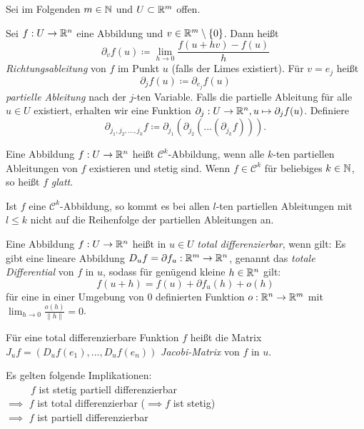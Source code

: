 \documentclass{cheat-sheet}
\begin{document}
\begin{nota}
  Sei im Folgenden $m \in \mathbb{N}$ und $U \subset \mathbb{R}^m$ offen.
\end{nota}

\begin{definition}
  Sei $f : U \to \mathbb{R}^n$ eine Abbildung und $v \in \mathbb{R}^m \setminus \{ 0 \}$. Dann heißt
  \[ \partial_v f(u) \coloneqq \lim_{h \to 0} \frac{f(u + hv) - f(u)}{ h } \]
  \emph{Richtungsableitung} von $f$ im Punkt $u$ (falls der Limes existiert). Für $v = e_j$ heißt
  \[ \partial_j f(u) \coloneqq \partial_{e_j} f(u) \]
  \emph{partielle Ableitung} nach der $j$-ten Variable. Falls die partielle Ableitung für alle $u \in U$ existiert, erhalten wir eine Funktion $\partial_j : U \to \mathbb{R}^n, u \mapsto \partial_j f(u)$. Definiere
  \[ \partial_{j_1, j_2, ..., j_k} f \coloneqq \partial_{j_1} ( \partial_{j_2} ( ... ( \partial_{j_k} f) ) ). \]
\end{definition}

\begin{definition}
  Eine Abbildung $f : U \to \mathbb{R}^n$ heißt $\mathcal{C}^k$-Abbildung, wenn alle $k$-ten partiellen Ableitungen von $f$ existieren und stetig sind. Wenn $f \in \mathcal{C}^k$ für beliebiges $k \in \mathbb{N}$, so heißt $f$ \emph{glatt}.
\end{definition}

\begin{satz}[Schwarz]
  Ist $f$ eine $\mathcal{C}^k$-Abbildung, so kommt es bei allen $l$-ten partiellen Ableitungen mit $l \leq k$ nicht auf die Reihenfolge der partiellen Ableitungen an.
\end{satz}

\begin{definition}
  Eine Abbildung $f : U \to \mathbb{R}^n$ heißt in $u \in U$ \emph{total differenzierbar}, wenn gilt: Es gibt eine lineare Abbildung $D_u f = \partial f_u : \mathbb{R}^m \to \mathbb{R}^n$, genannt das \emph{totale Differential} von $f$ in $u$, sodass für genügend kleine $h \in \mathbb{R}^n$ gilt:
  \[ f(u + h) = f(u) + \partial f_u(h) + o(h) \]
  für eine in einer Umgebung von $0$ definierten Funktion $o : \mathbb{R}^n \to \mathbb{R}^m$ mit $\lim_{h \to 0} \tfrac{o(h)}{\| h \|} = 0$.
\end{definition}

\begin{definition}
  Für eine total differenzierbare Funktion $f$ heißt die Matrix $J_u f = (D_u f(e_1), ..., D_u f(e_n))$ \emph{Jacobi-Matrix} von $f$ in $u$.
\end{definition}

\begin{bem}
Es gelten folgende Implikationen:\\
$\quad\quad\,\,\, f$ ist stetig partiell differenzierbar\\
$\implies$ $f$ ist total differenzierbar ($\!\implies f$ ist stetig)\\
$\implies$ $f$ ist partiell differenzierbar
\end{bem}
\end{document}
